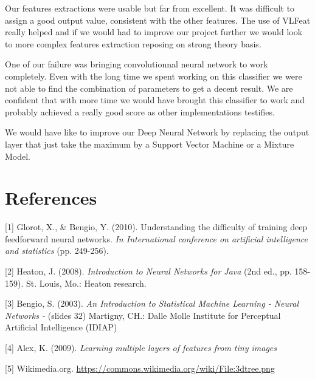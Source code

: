 \documentclass{article} %
\begin{document}
Our features extractions were usable but far from excellent. It was difficult to assign a good output value, consistent with the other features. The use of VLFeat really helped and if we would had to improve our project further we would look to more complex features extraction reposing on strong theory basis. 

One of our failure was bringing convolutionnal neural network to work completely. Even with the long time we spent working on this classifier we were not able to find the combination of parameters to get a decent result. We are confident that with more time we would have brought this classifier to work and probably achieved a really good score as other implementations testifies.

We would have like to improve our Deep Neural Network by replacing the output layer that just take the maximum by a Support Vector Machine or a Mixture Model. 




\section{References}
\small{
[1] Glorot, X., \& Bengio, Y. (2010). Understanding the difficulty of training deep feedforward neural networks. \textit{In International conference on artificial intelligence and statistics} (pp. 249-256).

[2] Heaton, J. (2008). \textit{Introduction to Neural Networks for Java} (2nd ed., pp. 158-159). St. Louis, Mo.: Heaton research.


[3] Bengio, S. (2003). \textit{An Introduction to Statistical Machine Learning - Neural Networks -} (slides 32) Martigny, CH.: Dalle Molle Institute for Perceptual Artificial Intelligence (IDIAP)

[4] Alex, K. (2009). \textit{Learning multiple layers of features from tiny images}

[5] Wikimedia.org. \url{https://commons.wikimedia.org/wiki/File:3dtree.png}
}
\end{document}
